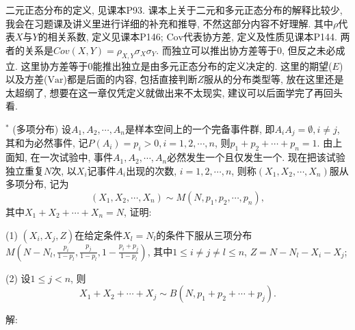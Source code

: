 \documentclass[standard]{ExBook}
\renewenvironment{shaded}{%
  \def\FrameCommand{\fboxsep=\FrameSep \colorbox{shadecolor}}%
  \MakeFramed{\advance\hsize-\width \FrameRestore}%
}{%
  \endMakeFramed
}
\begin{document}
\begin{qitems}
\textcolor{themeColor}{\selectfont {} 二元正态分布的定义, 见课本P93. 课本上关于二元和多元正态分布的解释比较少, 我会在习题课及讲义里进行详细的补充和推导, 不然这部分内容不好理解. 其中$\rho$代表$X$与$Y$的相关系数, 定义见课本P146; $\mathrm{Cov}$代表协方差, 定义及性质见课本P144. 两者的关系是$Cov(X,Y)=\rho_{X,Y}\sigma_{X}\sigma_{Y}$. 而独立可以推出协方差等于0, 但反之未必成立. 这里协方差等于0能推出独立是由多元正态分布的定义决定的. 这里的期望($E$)以及方差($\mathrm{Var}$)都是后面的内容, 包括直接判断$Z$服从的分布类型等, 放在这里还是太超纲了, 想要在这一章仅凭定义就做出来不太现实, 建议可以后面学完了再回头看.}

\vspace{2.5cm-5em}

    \begin{bbox}
    \begin{shaded}
        \qitem$^*$
(多项分布) 设$A_1,A_2,\cdots,A_n$是样本空间上的一个完备事件群, 即$A_{i}A_{j}=\emptyset,i\neq j$, 其和为必然事件, 记$P(A_i)=p_i>0,i=1,2,\cdots,n$, 则$p_1+p_2+\cdots+p_n=1$. 由上面知, 在一次试验中, 事件$A_1,A_2,\cdots,A_n$必然发生一个且仅发生一个. 现在把该试验独立重复$N$次, 以$X_i$记事件$A_i$出现的次数, $i=1,2,\cdots,n$, 则称$(X_1,X_2,\cdots,X_n)$服从多项分布, 记为
$$(X_1,X_2,\cdots,X_n)\sim M(N,p_1,p_2,\cdots,p_n),$$
其中$X_1+X_2+\cdots+X_n=N$, 证明:

(1) $(X_i,X_j,Z)$在给定条件$X_{l}=N_{l}$的条件下服从三项分布$M(N-N_l,\displaystyle\frac{p_i}{1-p_l},\displaystyle\frac{p_j}{1-p_l},1-\displaystyle\frac{p_i+p_j}{1-p_l})$, 其中$1\leq i\neq j\neq l\leq n$, $Z=N-N_l-X_i-X_j$;

(2) 设$1\leq j<n$, 则
$$X_1+X_2+\cdots+X_j\sim B(N,p_1+p_2+\cdots+p_j).$$
    \end{shaded}
    \end{bbox}

\vspace{\dimexpr2.5cm-5em\relax}

解: 


\end{qitems}
\end{document}
